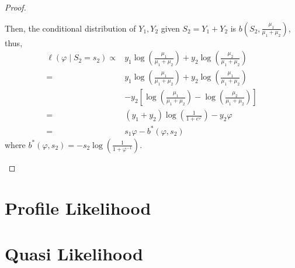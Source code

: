 \begin{proof}
\begin{enumerate}
              Then, the conditional distribution of $Y_{1},Y_{2}$ given $S_{2}=Y_{1}+Y_{2}$ is $b\left(S_{2},\frac{\mu_{1}}{\mu_{1}+\mu_{2}}\right)$, thus,
              \begin{equation*}
                  \begin{aligned}
                      \ell\left(\varphi\mid S_{2}=s_{2}\right)\propto & y_{1}\log\left(\frac{\mu_{1}}{\mu_{1}+\mu_{2}}\right)+y_{2}\log\left(\frac{\mu_{2}}{\mu_{1}+\mu_{2}}\right)          \\
                      =                                               & y_{1}\log\left(\frac{\mu_{1}}{\mu_{1}+\mu_{2}}\right)+y_{2}\log\left(\frac{\mu_{1}}{\mu_{1}+\mu_{2}}\right)          \\
                                                                      & -y_{2}\left[\log\left(\frac{\mu_{1}}{\mu_{1}+\mu_{2}}\right)-\log\left(\frac{\mu_{2}}{\mu_{1}+\mu_{2}}\right)\right] \\
                      =                                               & \left(y_{1}+y_{2}\right)\log\left(\frac{1}{1+e^{\varphi}}\right)-y_{2}\varphi                                        \\
                      =                                               & s_{1}\varphi-b^{*}\left(\varphi,s_{2}\right)
                  \end{aligned}
              \end{equation*}
              where $b^{*}\left(\varphi,s_{2}\right)=-s_{2}\log\left(\frac{1}{1+\varphi^{-1}}\right)$.
    \end{enumerate}
\end{proof}

\section{Profile Likelihood}

\section{Quasi Likelihood}